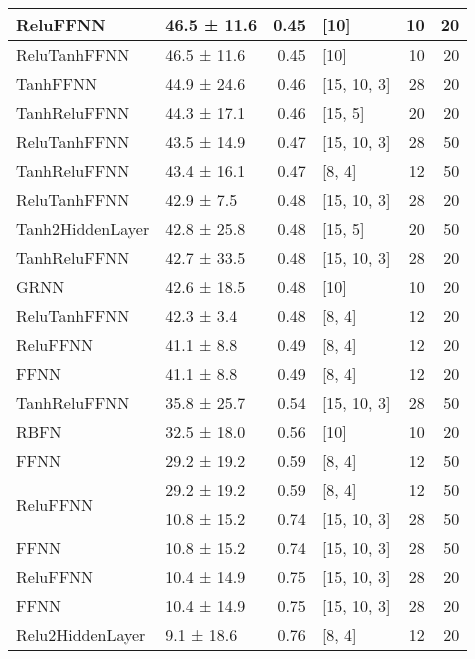 \begin{longtable}{llrlrr}
 \hline
ReluFFNN                            & 46.5 ± 11.6 &  0.45 & [10]           &         10 &       20 \\
 \hline
ReluTanhFFNN                        & 46.5 ± 11.6 &  0.45 & [10]           &         10 &       20 \\
 \hline
TanhFFNN                            & 44.9 ± 24.6 &  0.46 & [15, 10, 3]    &         28 &       20 \\
 \hline
TanhReluFFNN                        & 44.3 ± 17.1 &  0.46 & [15, 5]        &         20 &       20 \\
 \hline
ReluTanhFFNN                        & 43.5 ± 14.9 &  0.47 & [15, 10, 3]    &         28 &       50 \\
 \hline
TanhReluFFNN                        & 43.4 ± 16.1 &  0.47 & [8, 4]         &         12 &       50 \\
 \hline
ReluTanhFFNN                        & 42.9 ± 7.5  &  0.48 & [15, 10, 3]    &         28 &       20 \\
 \hline
Tanh2HiddenLayer                    & 42.8 ± 25.8 &  0.48 & [15, 5]        &         20 &       50 \\
 \hline
TanhReluFFNN                        & 42.7 ± 33.5 &  0.48 & [15, 10, 3]    &         28 &       20 \\
 \hline
GRNN                                & 42.6 ± 18.5 &  0.48 & [10]           &         10 &       20 \\
 \hline
ReluTanhFFNN                        & 42.3 ± 3.4  &  0.48 & [8, 4]         &         12 &       20 \\
 \hline
ReluFFNN                            & 41.1 ± 8.8  &  0.49 & [8, 4]         &         12 &       20 \\
 \hline
FFNN                                & 41.1 ± 8.8  &  0.49 & [8, 4]         &         12 &       20 \\
 \hline
TanhReluFFNN                        & 35.8 ± 25.7 &  0.54 & [15, 10, 3]    &         28 &       50 \\
 \hline
RBFN                                & 32.5 ± 18.0 &  0.56 & [10]           &         10 &       20 \\
 \hline
FFNN                                & 29.2 ± 19.2 &  0.59 & [8, 4]         &         12 &       50 \\
 \hline
\multirow{2}{*}{ReluFFNN}           & 29.2 ± 19.2 &  0.59 & [8, 4]         &         12 &       50 \\
                                            & 10.8 ± 15.2 &  0.74 & [15, 10, 3]    &         28 &       50 \\
 \hline
FFNN                                & 10.8 ± 15.2 &  0.74 & [15, 10, 3]    &         28 &       50 \\
 \hline
ReluFFNN                            & 10.4 ± 14.9 &  0.75 & [15, 10, 3]    &         28 &       20 \\
 \hline
FFNN                                & 10.4 ± 14.9 &  0.75 & [15, 10, 3]    &         28 &       20 \\
 \hline
Relu2HiddenLayer                    & 9.1 ± 18.6  &  0.76 & [8, 4]         &         12 &       20 \\
\hline
\end{longtable}
